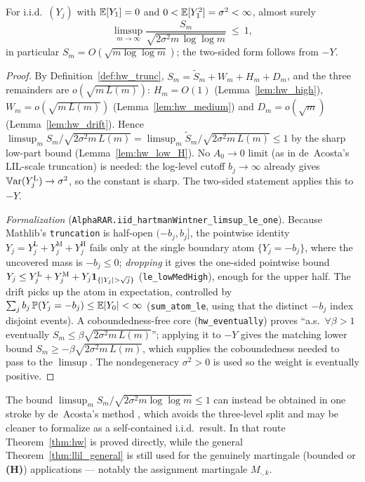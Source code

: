 \begin{theorem}\label{thm:hw}
\leanok
{}
For i.i.d.\ $(Y_j)$ with $\mathbb{E}[Y_1]=0$ and $0<\mathbb{E}[Y_1^2]=\sigma^2<\infty$, almost surely
\[
  \limsup_{m\to\infty}\frac{S_m}{\sqrt{2\sigma^2 m\,\log\log m}}\ \le\ 1,
\]
in particular $S_m=O(\sqrt{m\log\log m})$; the two-sided form follows from $-Y$.
\end{theorem}
\begin{proof}\leanok
By Definition~\ref{def:hw_trunc}, $S_m=\tilde S_m+W_m+H_m+D_m$, and the three remainders
are $o(\sqrt{m\,L(m)})$: $H_m=O(1)$ (Lemma~\ref{lem:hw_high}), $W_m=o(\sqrt{m\,L(m)})$
(Lemma~\ref{lem:hw_medium}) and $D_m=o(\sqrt m)$ (Lemma~\ref{lem:hw_drift}). Hence
$\limsup_m S_m/\sqrt{2\sigma^2 m\,L(m)}=\limsup_m\tilde S_m/\sqrt{2\sigma^2 m\,L(m)}\le1$
by the sharp low-part bound (Lemma~\ref{lem:hw_low_H}). No $A_0\to0$ limit (as in
de~Acosta's LIL-scale truncation) is needed: the log-level cutoff $b_j\to\infty$ already
gives $\mathbb{V}\mathrm{ar}(Y_j^{\mathrm L})\to\sigma^2$, so the constant is sharp. The two-sided statement
applies this to $-Y$.

\emph{Formalization} (\texttt{AlphaRAR.iid\_hartmanWintner\_limsup\_le\_one}). Because Mathlib's
\texttt{truncation} is half-open $(-b_j,b_j]$, the pointwise identity $Y_j=Y_j^{\mathrm L}+
Y_j^{\mathrm M}+Y_j^{\mathrm H}$ fails only at the single boundary atom $\{Y_j=-b_j\}$, where the
uncovered mass is $-b_j\le0$; \emph{dropping} it gives the one-sided pointwise bound $Y_j\le
Y_j^{\mathrm L}+Y_j^{\mathrm M}+Y_j\indic_{\{|Y_j|>\sqrt j\}}$ (\texttt{le\_lowMedHigh}), enough for the
upper half. The drift picks up the atom in expectation, controlled by $\sum_j b_j\,\mathbb{P}(Y_j=-b_j)\le
\mathbb{E}|Y_0|<\infty$ (\texttt{sum\_atom\_le}, using that the distinct $-b_j$ index disjoint events).
A coboundedness-free core (\texttt{hw\_eventually}) proves ``a.s.\ $\forall\beta>1$ eventually
$S_m\le\beta\sqrt{2\sigma^2 m\,L(m)}$''; applying it to $-Y$ gives the matching lower bound
$S_m\ge-\beta\sqrt{2\sigma^2 m\,L(m)}$, which supplies the coboundedness needed to pass to the
$\limsup$. The nondegeneracy $\sigma^2>0$ is used so the weight is eventually positive.
\end{proof}

\begin{remark}\label{rem:hw_deacosta}
The bound $\limsup_m S_m/\sqrt{2\sigma^2 m\log\log m}\le1$ can instead be obtained in one
stroke by de~Acosta's method \cite{deAcosta1983}, which avoids the three-level split and
may be cleaner to formalize as a self-contained i.i.d.\ result. In that route
Theorem~\ref{thm:hw} is proved directly, while the general Theorem~\ref{thm:llil_general}
is still used for the genuinely martingale (bounded or \textbf{(H)}) applications ---
notably the assignment martingale $M_{\cdot,k}$.
\end{remark}

